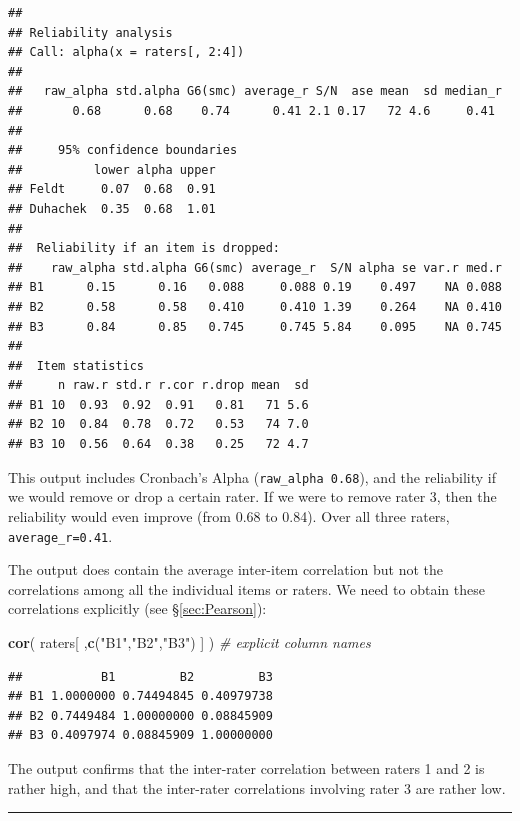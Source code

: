 \documentclass[
]{book}
\newenvironment{Shaded}{\begin{snugshade}}{\end{snugshade}}
\newcommand{\CommentTok}[1]{\textcolor[rgb]{0.56,0.35,0.01}{\textit{#1}}}
\newcommand{\FunctionTok}[1]{\textcolor[rgb]{0.13,0.29,0.53}{\textbf{#1}}}
\newcommand{\NormalTok}[1]{#1}
\newcommand{\StringTok}[1]{\textcolor[rgb]{0.31,0.60,0.02}{#1}}
\begin{document}
\begin{verbatim}
## 
## Reliability analysis   
## Call: alpha(x = raters[, 2:4])
## 
##   raw_alpha std.alpha G6(smc) average_r S/N  ase mean  sd median_r
##       0.68      0.68    0.74      0.41 2.1 0.17   72 4.6     0.41
## 
##     95% confidence boundaries 
##          lower alpha upper
## Feldt     0.07  0.68  0.91
## Duhachek  0.35  0.68  1.01
## 
##  Reliability if an item is dropped:
##    raw_alpha std.alpha G6(smc) average_r  S/N alpha se var.r med.r
## B1      0.15      0.16   0.088     0.088 0.19    0.497    NA 0.088
## B2      0.58      0.58   0.410     0.410 1.39    0.264    NA 0.410
## B3      0.84      0.85   0.745     0.745 5.84    0.095    NA 0.745
## 
##  Item statistics 
##     n raw.r std.r r.cor r.drop mean  sd
## B1 10  0.93  0.92  0.91   0.81   71 5.6
## B2 10  0.84  0.78  0.72   0.53   74 7.0
## B3 10  0.56  0.64  0.38   0.25   72 4.7
\end{verbatim}

This output includes Cronbach's Alpha (\texttt{raw\_alpha\ 0.68}), and the
reliability if we would remove or drop a certain rater.
If we were to remove rater 3, then the reliability would even
improve (from 0.68 to 0.84). Over all three raters,
\texttt{average\_r=0.41}.

The output does contain the average inter-item correlation but not the correlations among all the individual items or raters.
We need to obtain these correlations explicitly (see §\ref{sec:Pearson}):

\begin{Shaded}
\begin{Highlighting}[]
\FunctionTok{cor}\NormalTok{( raters[ ,}\FunctionTok{c}\NormalTok{(}\StringTok{"B1"}\NormalTok{,}\StringTok{"B2"}\NormalTok{,}\StringTok{"B3"}\NormalTok{) ] ) }\CommentTok{\# explicit column names}
\end{Highlighting}
\end{Shaded}

\begin{verbatim}
##           B1         B2         B3
## B1 1.0000000 0.74494845 0.40979738
## B2 0.7449484 1.00000000 0.08845909
## B3 0.4097974 0.08845909 1.00000000
\end{verbatim}

The output confirms that the inter-rater correlation between raters 1 and 2 is rather high, and that the inter-rater correlations involving rater 3 are rather low.

\begin{center}\rule{0.5\linewidth}{0.5pt}\end{center}
\end{document}

